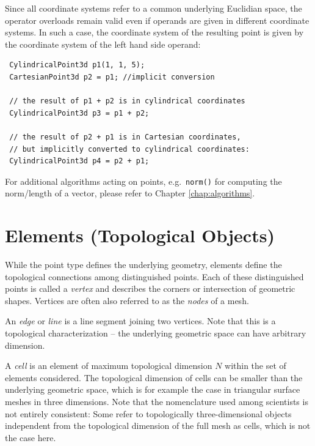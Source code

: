 
Since all coordinate systems refer to a common underlying Euclidian space, the operator overloads remain valid even if operands are given in different coordinate systems. In such a case, the coordinate system of the resulting point is given by the coordinate system of the left hand side operand:
\begin{lstlisting}
 CylindricalPoint3d p1(1, 1, 5);
 CartesianPoint3d p2 = p1; //implicit conversion

 // the result of p1 + p2 is in cylindrical coordinates
 CylindricalPoint3d p3 = p1 + p2;

 // the result of p2 + p1 is in Cartesian coordinates,
 // but implicitly converted to cylindrical coordinates:
 CylindricalPoint3d p4 = p2 + p1;
\end{lstlisting}
For additional algorithms acting on points, e.g.~\lstinline|norm()| for computing the norm/length of a vector, please refer to Chapter \ref{chap:algorithms}.


\section{Elements (Topological Objects)} \label{sec:ncells}
While the point type defines the underlying geometry, elements define the topological connections among distinguished points. Each of these distinguished points is called a \emph{vertex} and describes the corners or intersection of geometric shapes. Vertices are often also referred to as the \emph{nodes} of a mesh.

An \emph{edge} or \emph{line} is a line segment joining two vertices. Note that this is a topological characterization -- the underlying geometric space can have arbitrary dimension.

A \emph{cell} is an element of maximum topological dimension $N$ within the set of elements considered. The topological dimension of cells can be smaller than the underlying geometric space, which is for example the case in triangular surface meshes in three dimensions. Note that the nomenclature used among scientists is not entirely consistent: Some refer to topologically three-dimensional objects independent from the topological dimension of the full mesh as cells, which is not the case here.

